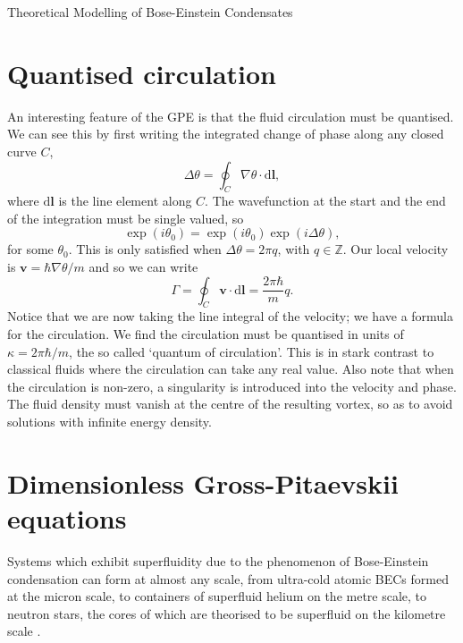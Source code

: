 \begin{chapter}{\label{cha:theoretical_model}Theoretical Modelling of Bose-Einstein Condensates}
\section{\label{section:quantisedcirculation} Quantised circulation}
An interesting feature of the GPE is that the fluid circulation must be quantised. We can see this by first writing the integrated change of phase along any closed curve $C$,
\begin{equation}
	\Delta\theta = \oint_C \! \nabla \theta  \cdot \mathrm{d}\mathbf{l},
\end{equation}
where $\mathrm{d}\mathbf{l}$ is the line element along $C$. The wavefunction at the start and the end of the integration must be single valued, so
\begin{equation}
	\exp (i\theta_0) = \exp (i\theta_0)\exp (i\Delta\theta),
\end{equation}
for some $\theta_0$. This is only satisfied when $\Delta\theta = 2\pi q$, with $q\in\mathbb{Z}$. Our local velocity is $\mathbf{v} = \hbar\nabla\theta/m $ and so we can write
\begin{equation}
	\Gamma = \oint_C \! \mathbf{v} \cdot \mathrm{d}\mathbf{l} = \frac{2 \pi \hbar}{m}q.
\end{equation}
Notice that we are now taking the line integral of the velocity; we have a formula for the circulation. We find the circulation must be quantised in units of $\kappa = 2 \pi \hbar/m$, the so called `quantum of circulation'. This is in stark contrast to classical fluids where the circulation can take any real value. Also note that when the circulation is non-zero, a singularity is introduced into the velocity and phase. The fluid density must vanish at the centre of the resulting vortex, so as to avoid solutions with infinite energy density.

\section{\label{section:gpedimless} Dimensionless Gross-Pitaevskii equations}
	Systems which exhibit superfluidity due to the phenomenon of Bose-Einstein condensation can form at almost any scale, from ultra-cold atomic BECs formed at the micron scale, %
	to containers of superfluid helium on the metre scale, to neutron stars, the cores of which are theorised to be superfluid on the kilometre scale \cite{Warszawski01082011}.


\end{chapter}
